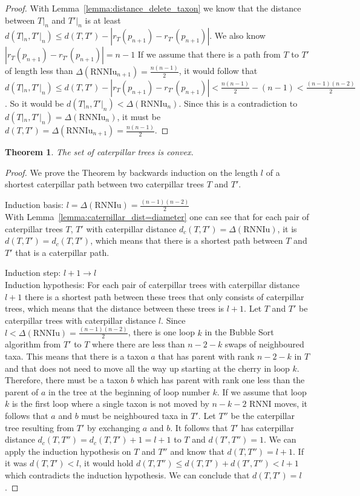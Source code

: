 \documentclass[11pt, a4paper]{article}
\newcommand{\rnni}{\mathrm{RNNI}}
\newcommand{\rnniu}{\mathrm{RNNIu}}
\newtheorem{theorem}[definition]{Theorem}
\begin{document}
\begin{proof}
    With Lemma~\ref{lemma:distance_delete_taxon} we know that the distance between $T|_n$ and $T'|_n$ is at least $d(T|_n, T'|_n) \leq d(T,T') - |r_{T}(p_{n+1}) - r_{T'}(p_{n+1})|$.
    We also know $|r_{T}(p_{n+1}) - r_{T'}(p_{n+1})| = n-1$
    If we assume that there is a path from $T$ to $T'$ of length less than $\Delta(\rnniu_{n+1}) = \frac{n(n-1)}{2}$, it would follow that $d(T|_n, T'|_n) \leq d(T,T') - |r_{T}(p_{n+1}) - r_{T'}(p_{n+1})| < \frac{n(n-1)}{2} - (n-1) < \frac{(n-1)(n-2)}{2}$.
    So it would be $d(T|_n, T'|_n) < \Delta(\rnniu_n)$.
    Since this is a contradiction to $d(T|_n, T'|_n) = \Delta(\rnniu_n)$, it must be $d(T,T') = \Delta(\rnniu_{n+1}) = \frac{n(n-1)}{2} $.

\end{proof}

\begin{theorem}
    The set of caterpillar trees is convex.
\end{theorem}

\begin{proof}
    We prove the Theorem by backwards induction on the length $l$ of a shortest caterpillar path between two caterpillar trees $T$ and $T'$.

    Induction basis: $l = \Delta(\rnniu) = \frac{(n-1)(n-2)}{2}$\\
    With Lemma~\ref{lemma:caterpillar_dist=diameter} one can see that for each pair of caterpillar trees $T$, $T'$ with caterpillar distance $d_c(T,T') = \Delta(\rnniu)$, it is $d(T,T') = d_c(T,T')$, which means that there is a shortest path between $T$ and $T'$ that is a caterpillar path.

    Induction step: $l+1 \to l$\\
    Induction hypothesis: For each pair of caterpillar trees with caterpillar distance $l+1$ there is a shortest path between these trees that only consists of caterpillar trees, which means that the distance between these trees is $l+1$.
    Let $T$ and $T'$ be caterpillar trees with caterpillar distance $l$.
    Since $l < \Delta(\rnniu) = \frac{(n-1)(n-2)}{2}$, there is one loop $k$ in the Bubble Sort algorithm from $T'$ to $T$ where there are less than $n-2-k$ swaps of neighboured taxa.
    This means that there is a taxon $a$ that has parent with rank $n-2-k$ in $T$ and that does not need to move all the way up starting at the cherry in loop $k$.
    Therefore, there must be a taxon $b$ which has parent with rank one less than the parent of $a$ in the tree at the beginning of loop number $k$.
    If we assume that loop $k$ is the first loop where a single taxon is not moved by $n-k-2$ $\rnni$ moves, it follows that $a$ and $b$ must be neighboured taxa in $T'$.
    Let $T''$ be the caterpillar tree resulting from $T'$ by exchanging $a$ and $b$.
    It follows that $T'$ has caterpillar distance $d_c(T,T'') = d_c(T,T') + 1 = l+1$ to $T$ and $d(T',T'') = 1$.
    We can apply the induction hypothesis on $T$ and $T''$ and know that $d(T,T'') = l+1$.
    If it was $d(T,T') < l$, it would hold $d(T,T'') \leq d(T,T') + d(T',T'') < l + 1$ which contradicts the induction hypothesis.
    We can conclude that $d(T,T') = l$.

\end{proof}
\end{document}
